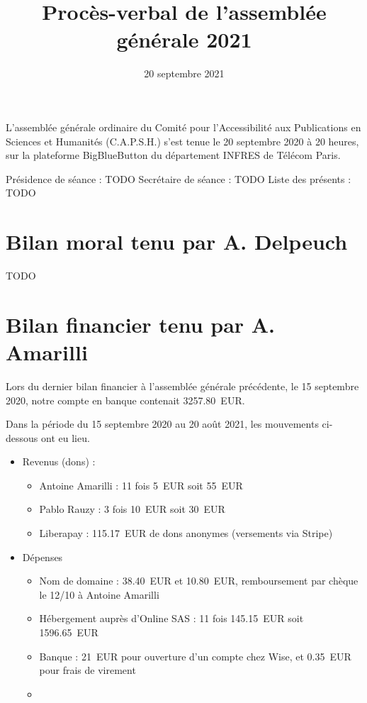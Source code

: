 \documentclass[a4paper]{article}
\title{Procès-verbal de l'assemblée générale 2021}
\date{20 septembre 2021}
\begin{document}
\maketitle

L'assemblée générale ordinaire du Comité pour l'Accessibilité aux Publications
en Sciences et Humanités (C.A.P.S.H.) s'est tenue le 20 septembre 2020 à 20 heures, sur la plateforme BigBlueButton du département INFRES de Télécom Paris. 

Présidence de séance : TODO
Secrétaire de séance : TODO
Liste des présents : TODO
    
\section{Bilan moral tenu par A. Delpeuch}

TODO

\section{Bilan financier tenu par A. Amarilli}
Lors du dernier bilan financier à l'assemblée générale précédente, le 15
septembre 2020, notre compte en banque contenait 3257.80~EUR.

Dans la période du 15 septembre 2020 au 20 août 2021, les mouvements ci-dessous ont eu lieu.

\begin{itemize}
\item Revenus (dons) :
  \begin{itemize}
    \item Antoine Amarilli : 11 fois 5~EUR soit 55~EUR
    \item Pablo Rauzy : 3 fois 10~EUR soit 30~EUR
    \item Liberapay : 115.17~EUR de dons anonymes (versements via Stripe)
  \end{itemize}
\item Dépenses
  \begin{itemize}
    \item Nom de domaine : 38.40~EUR et 10.80~EUR, remboursement par chèque le
      12/10 à Antoine Amarilli
    \item Hébergement auprès d'Online SAS : 11 fois 145.15~EUR soit 1596.65~EUR
    \item Banque : 21~EUR pour ouverture d'un compte chez Wise, et 0.35~EUR pour
      frais de virement
    \item 
  \end{itemize}
\end{itemize}
\end{document}
